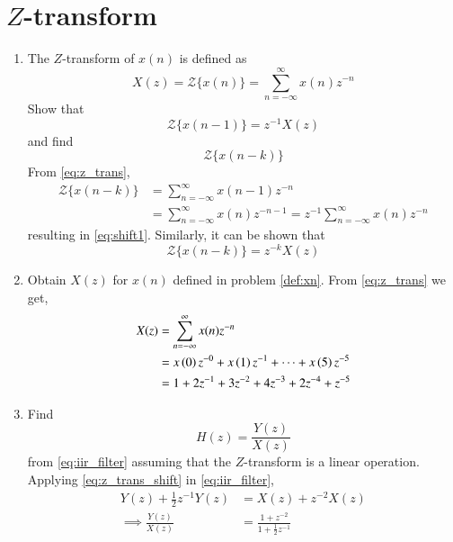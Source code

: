 \documentclass[journal,12pt,twocolumn]{IEEEtran}
\renewcommand\thesection{\arabic{section}}
\begin{document}
\section{$Z$-transform}
\begin{enumerate}[label=\thesection.\arabic*]
\item The $Z$-transform of $x(n)$ is defined as
%
\begin{equation}
	\label{eq:z_trans}
	X(z)={\mathcal {Z}}\{x(n)\}=\sum _{n=-\infty }^{\infty }x(n)z^{-n}
\end{equation}
%
Show that
\begin{equation}
	\label{eq:shift1}
	{\mathcal {Z}}\{x(n-1)\} = z^{-1}X(z)
\end{equation}
and find
\begin{equation}
	{\mathcal {Z}}\{x(n-k)\} 
\end{equation}
\solution From \eqref{eq:z_trans},
\begin{align}
	{\mathcal {Z}}\{x(n-k)\} &=\sum _{n=-\infty }^{\infty }x(n-1)z^{-n}
	\\
	&=\sum _{n=-\infty }^{\infty }x(n)z^{-n-1} = z^{-1}\sum _{n=-\infty }^{\infty }x(n)z^{-n}
\end{align}
resulting in \eqref{eq:shift1}. Similarly, it can be shown that
%
\begin{equation}
	\label{eq:z_trans_shift}
	{\mathcal {Z}}\{x(n-k)\} = z^{-k}X(z)
\end{equation}
\item Obtain $X(z)$ for $x(n)$ defined in problem 
\ref{def:xn}.
\solution
From \eqref{eq:z_trans} we get,
\begin{align}
	X(z)&=\sum _{n=-\infty }^{\infty }x(n)z^{-n}\\
	&=x\left(0\right)z^{-0} + x\left(1\right)z^{-1}+\dots+x\left(5\right)z^{-5}\\
	&=1+2z^{-1}+3z^{-2}+4z^{-3}+2z^{-4}+z^{-5}
\end{align}
\item Find
%
\begin{equation}
	H(z) = \frac{Y(z)}{X(z)}
\end{equation}
%
from  \eqref{eq:iir_filter} assuming that the $Z$-transform is a linear operation.
\\
\solution  Applying \eqref{eq:z_trans_shift} in \eqref{eq:iir_filter},
\begin{align}
	Y(z) + \frac{1}{2}z^{-1}Y(z) &= X(z)+z^{-2}X(z)
	\\
	\implies \frac{Y(z)}{X(z)} &= \frac{1 + z^{-2}}{1 + \frac{1}{2}z^{-1}}
	\label{eq:freq_resp}
\end{align}

\end{enumerate}
\end{document}
